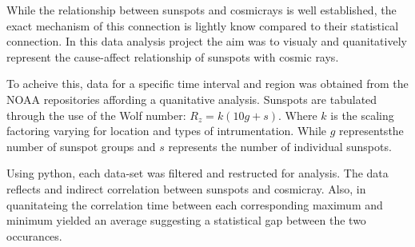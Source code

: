 \par While the relationship between sunspots and cosmicrays is well established,
the exact mechanism of this connection is lightly know compared to their
statistical connection. In this data analysis project the aim was to visualy
and quanitatively represent the cause-affect relationship of sunspots with
cosmic rays.\\
\par To acheive this, data for a specific time interval and region was 
obtained from the NOAA repositories affording a quanitative analysis.\cite{raydata} \cite{spotdata}
Sunspots are tabulated through the use of the Wolf number: $R_z=k(10g+s)$.
Where $k$ is the scaling factoring varying for location and types of intrumentation.
While $g$ representsthe number of sunspot groups and $s$ represents the number
of individual sunspots.\\
\par Using python, each data-set was filtered and
restructed for analysis. The data reflects and indirect correlation between
sunspots and cosmicray. Also, in quanitateing the correlation time between
each corresponding maximum and minimum yielded an average suggesting
a statistical gap between the two occurances.
